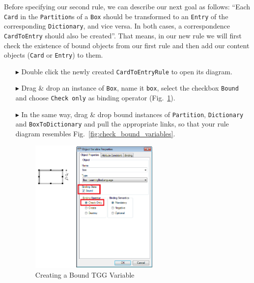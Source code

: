 Before specifying our second rule, we can describe our next goal as follows: ``Each \texttt{Card} in the \texttt{Partition}s of a \texttt{Box} should be transformed to an \texttt{Entry} of the corresponding \texttt{Dictionary}, and vice versa. 
In both cases, a correspondence \texttt{CardToEntry} should also be created''. 
That means, in our new rule we will first check the existence of bound objects from our first rule and then add our content objects (\texttt{Card} or \texttt{Entry}) to them.

\begin{enumerate}
\item[$\blacktriangleright$] Double click the newly created \texttt{CardToEntryRule} to open its diagram.
\item[$\blacktriangleright$] Drag \& drop an instance of \texttt{Box}, name it \texttt{box}, select the checkbox \texttt{Bound} and choose \texttt{Check only} as binding operator (Fig.~\ref{fig:bound_tgg_variable}).
\item[$\blacktriangleright$] In the same way, drag \& drop bound instances of \texttt{Partition}, \texttt{Dictionary} and \texttt{BoxToDictionary} and pull the appropriate links, so that your rule diagram resembles Fig.~\ref{fig:check_bound_variables}.

\begin{figure}[htbp]
\begin{center}
  \includegraphics[width=0.6\textwidth]{pics/tggBilder/tggRule/tgg17}
  \caption{Creating a Bound TGG Variable}  
  \label{fig:bound_tgg_variable}
\end{center}
\end{figure}


\end{enumerate}
